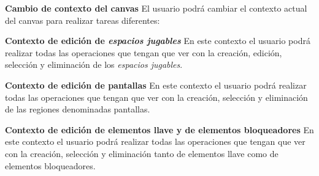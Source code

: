 	\item \textbf{Cambio de contexto del canvas}\newline
		El usuario podrá cambiar el contexto actual del canvas para realizar tareas diferentes:
		\begin{functional}
			\item \textbf{Contexto de edición de \textit{espacios jugables}}\newline
				En este contexto el usuario podrá realizar todas las operaciones que tengan que ver con la creación, edición, selección y eliminación de los \textit{espacios jugables}.
			\item \textbf{Contexto de edición de pantallas}\newline
				En este contexto el usuario podrá realizar todas las operaciones que tengan que ver con la creación, selección y eliminación de las regiones denominadas pantallas.
			\item \textbf{Contexto de edición de elementos llave y de elementos bloqueadores}\newline
				En este contexto el usuario podrá realizar todas las operaciones que tengan que ver con la creación, selección y eliminación tanto de elementos llave como de elementos bloqueadores.
		\end{functional}
